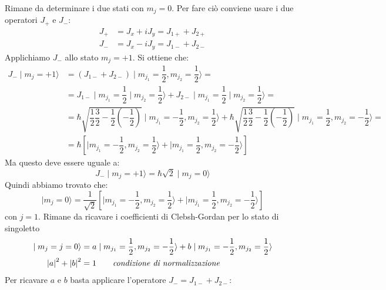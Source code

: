 Rimane da determinare i due stati con $m_{j} = 0$. Per fare ciò conviene usare i
due operatori $J_{+}$ e $J_{-}$:
\begin{align}
J_{+} &= J_{x} + iJ_{y} = J_{1+} + J_{2+} \\
J_{-} &= J_{x} - iJ_{y} = J_{1-} + J_{2-}
\end{align}
Applichiamo $J_{-}$ allo stato $m_{j} = +1$. Si ottiene che:
\begin{equation}
\begin{split}
J_{-}\mid m_{j} = +1 \rangle &= \left(J_{1-} + J_{2-}\right) \mid m_{j_{1}} = \dfrac{1}{2}, m_{j_{2}} = \dfrac{1}{2}\rangle = \\
&= J_{1-}  \mid m_{j_{1}} = \dfrac{1}{2}\mid m_{j_{2}} = \dfrac{1}{2}\rangle + J_{2-} \mid m_{j_{1}} = \dfrac{1}{2}\mid m_{j_{2}} = \dfrac{1}{2}\rangle = \\
&= \hbar \sqrt{\dfrac{1}{2}\dfrac{3}{2}-\dfrac{1}{2}\left(-\dfrac{1}{2}\right)} \mid m_{j_{1}} = -\dfrac{1}{2}, m_{j_{2}} = \dfrac{1}{2} \rangle + \hbar \sqrt{\dfrac{1}{2}\dfrac{3}{2}-\dfrac{1}{2}\left(-\dfrac{1}{2}\right)} \mid m_{j_{1}} = \dfrac{1}{2}, m_{j_{2}} = -\dfrac{1}{2} \rangle = \\
&= \hbar \left[ \mid m_{j_{1}} = -\dfrac{1}{2}, m_{j_{2}} = \dfrac{1}{2} \rangle + \mid m_{j_{1}} = \dfrac{1}{2}, m_{j_{2}} = -\dfrac{1}{2} \rangle \right]
\end{split}
\end{equation}
Ma questo deve essere uguale a:
\begin{equation}
J_{-} \mid m_{j} = +1 \rangle = \hbar \sqrt{2}\mid m_{j} = 0 \rangle
\end{equation}
Quindi abbiamo trovato che:
\begin{equation}
\mid m_{j} = 0 \rangle = \dfrac{1}{\sqrt{2}}\left[ \mid m_{j_{1}} = -\dfrac{1}{2}, m_{j_{2}} = \dfrac{1}{2} \rangle + \mid m_{j_{1}} = \dfrac{1}{2}, m_{j_{2}} = -\dfrac{1}{2}\rangle \right] 
\end{equation}
con $j=1$. 
\breaknote
Rimane da ricavare i coefficienti di Clebsh-Gordan per lo
stato di singoletto
\begin{align}
\mid m_{j} = j = 0 \rangle &= a \mid m_{j_{1}} = \dfrac{1}{2}, m_{j_{2}} = -\dfrac{1}{2} \rangle + b \mid m_{j_{1}} = -\dfrac{1}{2}, m_{j_{2}} = \dfrac{1}{2} \rangle \\
\left| a \right| ^{2} + \left| b \right| ^{2} &= 1  \quad \quad \text{\textit{condizione di normalizzazione}}
\end{align}
Per ricavare $a$ e $b$ basta applicare l'operatore $J_{-} = J_{1-} + J_{2-}$:
